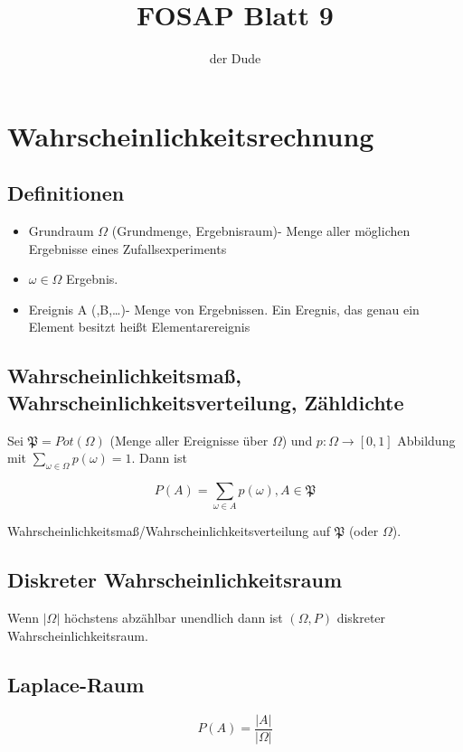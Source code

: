 \documentclass{scrartcl}%
\begin{document}
\title{FOSAP Blatt 9}%
\author{der Dude}
\maketitle%
\tableofcontents
\newpage
\section{Wahrscheinlichkeitsrechnung}

\subsection{Definitionen}

\begin{itemize}
	\item{Grundraum $\Omega$ (Grundmenge, Ergebnisraum)- Menge aller möglichen Ergebnisse eines Zufallsexperiments}
	\item{$\omega \in \Omega$ Ergebnis.}
	\item{Ereignis A (,B,\ldots)- Menge von Ergebnissen. Ein Eregnis, das genau ein Element besitzt heißt Elementarereignis}
\end{itemize}


\subsection{Wahrscheinlichkeitsmaß, Wahrscheinlichkeitsverteilung, Zähldichte}
Sei $\mathfrak{P} = Pot(\Omega)$ (Menge aller Ereignisse über $\Omega$) und $p: \Omega \rightarrow [0,1]$ Abbildung mit $\sum_{\omega \in \Omega} p(\omega) = 1$. Dann ist 

\[P(A) = \sum_{\omega \in A} p(\omega), A \in \mathfrak{P}\]

Wahrscheinlichkeitsmaß/Wahrscheinlichkeitsverteilung auf $\mathfrak{P}$ (oder $\Omega$).

\subsection{Diskreter Wahrscheinlichkeitsraum}
Wenn $\vert \Omega\vert$ höchstens abzählbar unendlich dann ist $(\Omega, P)$ diskreter Wahrscheinlichkeitsraum.

\subsection{Laplace-Raum}
\[P(A) = \frac{\vert A\vert}{\vert \Omega\vert}\]
\end{document}

